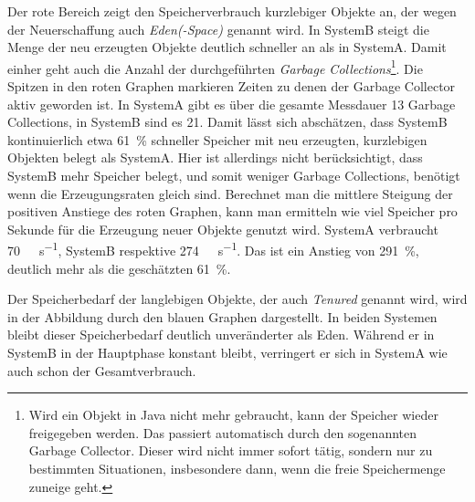 Der rote Bereich zeigt den Speicherverbrauch kurzlebiger Objekte an, der wegen der Neuerschaffung auch \emph{Eden(-Space)} genannt wird. In SystemB steigt die Menge der neu erzeugten Objekte deutlich schneller an als in SystemA. Damit einher geht auch die Anzahl der durchgeführten \emph{Garbage Collections}\footnote{Wird ein Objekt in Java nicht mehr gebraucht, kann der Speicher wieder freigegeben werden. Das passiert automatisch durch den sogenannten Garbage Collector. Dieser wird nicht immer sofort tätig, sondern nur zu bestimmten Situationen, insbesondere dann, wenn die freie Speichermenge zuneige geht.}. Die Spitzen in den roten Graphen markieren Zeiten zu denen der Garbage Collector aktiv geworden ist. In SystemA gibt es über die gesamte Messdauer 13 Garbage Collections, in SystemB sind es 21. Damit lässt sich abschätzen, dass SystemB kontinuierlich etwa \SI{61}{\percent} schneller Speicher mit neu erzeugten, kurzlebigen Objekten belegt als SystemA. Hier ist allerdings nicht berücksichtigt, dass SystemB mehr Speicher belegt, und somit  weniger Garbage Collections, benötigt wenn die Erzeugungsraten gleich sind. Berechnet man die mittlere Steigung der positiven Anstiege des roten Graphen, kann man ermitteln wie viel Speicher pro Sekunde für die Erzeugung neuer Objekte genutzt wird. SystemA verbraucht \SI{70}{\mega\byte\per\second}, SystemB respektive \SI{274}{\mega\byte\per\second}. Das ist ein Anstieg von \SI{291}{\percent}, deutlich mehr als die geschätzten \SI{61}{\percent}.

Der Speicherbedarf der langlebigen Objekte, der auch \emph{Tenured} genannt wird, wird in der Abbildung durch den blauen Graphen dargestellt. In beiden Systemen bleibt dieser Speicherbedarf deutlich unveränderter als Eden. Während er in SystemB in der Hauptphase konstant bleibt, verringert er sich in SystemA wie auch schon der Gesamtverbrauch.